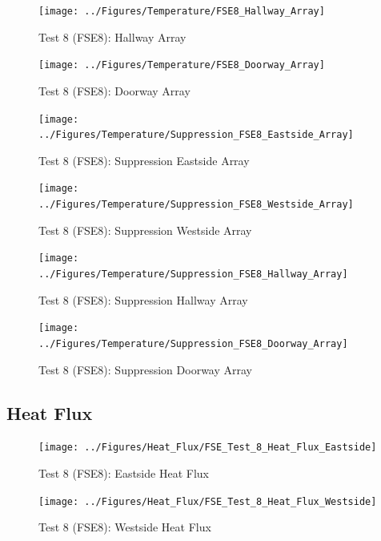 \documentclass[12pt,oneside]{book}
\begin{document}
\begin{figure}[!ht]
	\texttt{[image: ../Figures/Temperature/FSE8\_Hallway\_Array]}
	\caption{Test 8 (FSE8): Hallway Array}
	\label{fig:Test_8_Hallway_Array}
\end{figure}

\begin{figure}[!ht]
	\texttt{[image: ../Figures/Temperature/FSE8\_Doorway\_Array]}
	\caption{Test 8 (FSE8): Doorway Array}
	\label{fig:Test_8_Doorway_Array}
\end{figure}

\begin{figure}[!ht]
	\texttt{[image: ../Figures/Temperature/Suppression\_FSE8\_Eastside\_Array]}
	\caption{Test 8 (FSE8): Suppression Eastside Array}
	\label{fig:Test_8_Suppression_Eastside_Array}
\end{figure}

\begin{figure}[!ht]
	\texttt{[image: ../Figures/Temperature/Suppression\_FSE8\_Westside\_Array]}
	\caption{Test 8 (FSE8): Suppression Westside Array}
	\label{fig:Test_8_Suppression_Westside_Array}
\end{figure}

\begin{figure}[!ht]
	\texttt{[image: ../Figures/Temperature/Suppression\_FSE8\_Hallway\_Array]}
	\caption{Test 8 (FSE8): Suppression Hallway Array}
	\label{fig:Test_8_Suppression_Hallway_Array}
\end{figure}

\begin{figure}[!ht]
	\texttt{[image: ../Figures/Temperature/Suppression\_FSE8\_Doorway\_Array]}
	\caption{Test 8 (FSE8): Suppression Doorway Array}
	\label{fig:Test_8_Suppression_Doorway_Array}
\end{figure}

\subsection{Heat Flux}
\label{subsec:Heat_Flux}

\begin{figure}[!ht]
	\texttt{[image: ../Figures/Heat\_Flux/FSE\_Test\_8\_Heat\_Flux\_Eastside]}
	\caption{Test 8 (FSE8): Eastside Heat Flux}
	\label{fig:Test_8_Eastside_Heat_Flux}
\end{figure}

\begin{figure}[!ht]
	\texttt{[image: ../Figures/Heat\_Flux/FSE\_Test\_8\_Heat\_Flux\_Westside]}
	\caption{Test 8 (FSE8): Westside Heat Flux}
	\label{fig:Test_8_Westside_Heat_Flux}
\end{figure}
\end{document}
